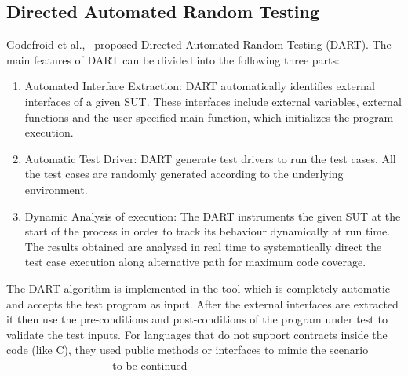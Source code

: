 {\subsection{Directed Automated Random Testing}
Godefroid et al.,~\cite{Godefroid2005} proposed Directed Automated Random Testing (DART). %
The main features of DART can be divided into the following three parts:
\begin{enumerate}
\item Automated Interface Extraction: DART automatically identifies external interfaces of a given SUT. These interfaces include external variables, external functions and the user-specified main function, which initializes the program execution.
\item Automatic Test Driver: DART generate test drivers to run the test cases. All the test cases are randomly generated according to the underlying environment.
\item Dynamic Analysis of execution: The DART instruments the given SUT at the start of the process in order to track its behaviour dynamically at run time. The results obtained are analysed in real time to systematically direct the test case execution along alternative path for maximum code coverage.
\end{enumerate}

The DART algorithm is implemented in the tool which is completely automatic and accepts the test program as input. After the external interfaces are extracted it then use the pre-conditions and post-conditions of the program under test to validate the test inputs. For languages that do not support contracts inside the code (like C), they used public methods or interfaces to mimic the scenario —————————- to be continued

}
